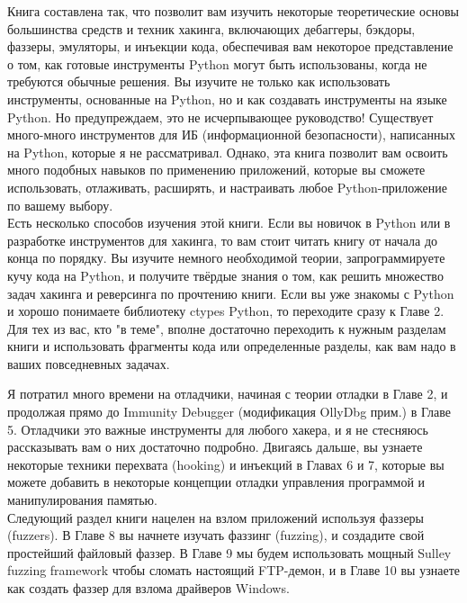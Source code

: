 \documentclass[12pt, a4paper, oneside]{book}
\begin{document}
Книга составлена так, что позволит вам изучить некоторые теоретические основы большинства средств и техник хакинга, включающих дебаггеры, бэкдоры, фаззеры, эмуляторы, и инъекции кода, обеспечивая вам некоторое представление о том, как готовые инструменты Python могут быть использованы, когда не требуются обычные решения. Вы изучите не только как использовать инструменты, основанные на Python, но и как создавать инструменты на языке Python. Но предупреждаем, это не исчерпывающее руководство! Существует много-много инструментов для ИБ (информационной безопасности), написанных на Python, которые я не рассматривал. Однако, эта книга позволит вам освоить много подобных навыков по применению приложений, которые вы сможете использовать, отлаживать, расширять, и настраивать любое Python-приложение по вашему выбору.\\

Есть несколько способов изучения этой книги. Если вы новичок в Python или в разработке инструментов для хакинга, то вам стоит читать книгу от начала до конца по порядку. Вы изучите немного необходимой теории, запрограммируете кучу кода на Python, и получите твёрдые знания о том, как решить множество задач хакинга и реверсинга по прочтению книги. Если вы уже знакомы с Python и хорошо понимаете библиотеку ctypes Python, то переходите сразу к Главе 2. Для тех из вас, кто "в теме", вполне достаточно переходить к нужным разделам книги и использовать фрагменты кода или определенные разделы, как вам надо в ваших повседневных задачах.\\
\newpage

Я потратил много времени на отладчики, начиная с теории отладки в Главе 2, и продолжая прямо до Immunity Debugger (модификация OllyDbg прим.) в Главе 5. Отладчики это важные инструменты для любого хакера, и я не стесняюсь рассказывать вам о них достаточно подробно. Двигаясь дальше, вы узнаете некоторые техники перехвата (hooking) и инъекций в Главах 6 и 7, которые вы можете добавить в некоторые концепции отладки управления программой и манипулирования памятью.\\

Следующий раздел книги нацелен на взлом приложений используя фаззеры (fuzzers). В Главе 8 вы начнете изучать фаззинг (fuzzing), и создадите свой простейший файловый фаззер. В Главе 9 мы будем использовать мощный Sulley fuzzing framework чтобы сломать настоящий FTP-демон, и в Главе 10 вы узнаете как создать фаззер для взлома драйверов Windows.\\
\end{document}
